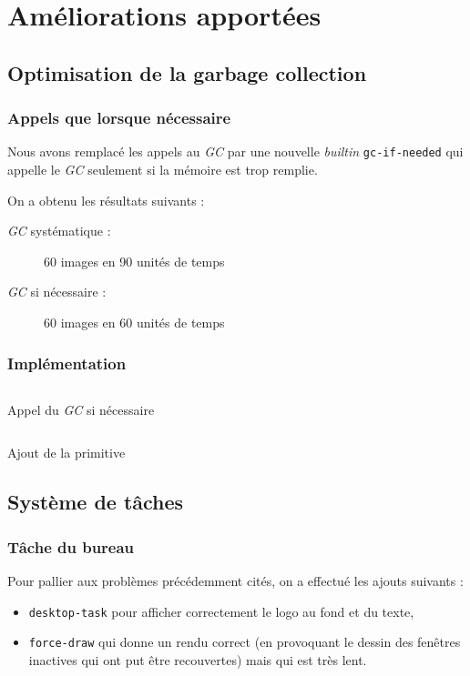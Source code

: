 \documentclass[c, 11pt, handout, xcolor=table]{beamer}
\newcommand{\source}[5]{
  \begin{table}[H]
    \centering
    \inputminted[frame=lines,linenos,style=colorful,fontfamily=tt,breaklines,autogobble,firstline=#3,firstnumber=#3,lastline=#4,label={#2[#3--#4]}]{#1}{../interim/sledge/#2}
    \captionsetup{name=Listing,labelformat=listing,labelsep=endash}
    \caption{#5}
  \end{table}
  }
\newcommand{\sourceC}[4]{\source{C}{#1}{#2}{#3}{#4}}
\newcommand{\sourceLisp}[4]{\source{Lisp}{os/#1}{#2}{#3}{#4}}
\newcommand{\codeLisp}[1]{\texttt{#1}}
\newcommand{\foreign}[1]{\emph{#1}}
\begin{document}
\section{Améliorations apportées}

\subsection{Optimisation de la garbage collection}

\begin{frame}
 \frametitle{Appels que lorsque nécessaire}
 
 Nous avons remplacé les appels au \foreign{GC} par une nouvelle \foreign{builtin} \codeLisp{gc-if-needed} qui appelle le \foreign{GC} seulement si la mémoire est trop remplie.

 On a obtenu les résultats suivants :
 \begin{description}
  \item [\foreign{GC} systématique :] 60 images en 90 unités de temps
  \item [\foreign{GC} si nécessaire :] 60 images en 60 unités de temps
 \end{description}
\end{frame}

\begin{frame}
 \frametitle{Implémentation}
 
 \tiny
 \sourceC{alloc.c}{186}{191}{Appel du \foreign{GC} si nécessaire}
 \begin{table}[H]
  \centering
  \inputminted[frame=lines,linenos,style=colorful,fontfamily=tt,breaklines,autogobble,firstline=1638,firstnumber=1638,lastline=1646,label={compiler\_new[1638--1646]}]{C}{../interim/sledge/compiler_new.c}
  \captionsetup{name=Listing,labelformat=listing,labelsep=endash}
  \caption{Ajout de la primitive}
 \end{table}
\end{frame}

 
\subsection{Système de tâches}

\begin{frame}
 \frametitle{Tâche du bureau}
 
  Pour pallier aux problèmes précédemment cités, on a effectué les ajouts suivants :
 \begin{itemize}
  \item \codeLisp{desktop-task} pour afficher correctement le logo au fond et du texte,
  \item \codeLisp{force-draw} qui donne un rendu correct (en provoquant le dessin des fenêtres inactives qui ont put être recouvertes) mais qui est très lent.
 \end{itemize}

\end{frame}
\end{document}
